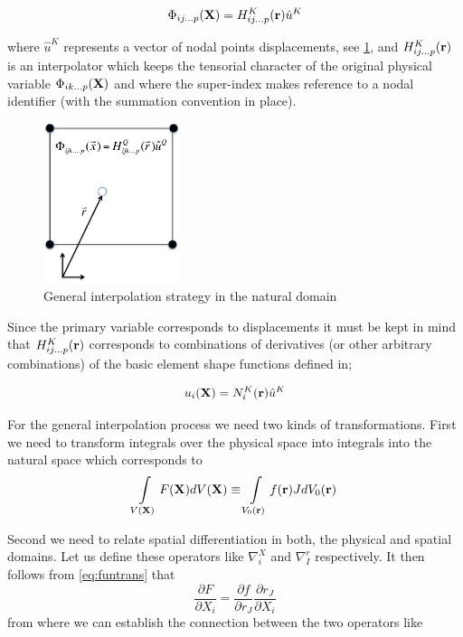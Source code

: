 \begin{equation}
\Phi_{ij...p}(\vb{X})=H_{ij...p}^K(\vb{r})\hat{u}^K
\label{eq:interpol}
\end{equation}

where $\hat{u}^K$ represents a vector of nodal points displacements, see \cref{fig:interpol nat dom}, and $H_{ij...p}^K(\vb{r})$ is an interpolator which keeps the tensorial character of the original physical variable $\Phi_{ik...p}(\vb{X})$ and where the super-index makes reference to a nodal identifier (with the summation convention in place).


\begin{figure}[h]
\centering
\includegraphics[width=4cm]{img/figure2.pdf}
\caption{General interpolation strategy in the natural domain}
\label{fig:interpol nat dom}
\end{figure}
 


Since the primary variable corresponds to displacements it must be kept in mind that $H_{ij...p}^K(\vb{r})$ corresponds to combinations of derivatives (or other arbitrary combinations) of the basic element shape functions defined in;


\begin{equation}
u_i(\vb{X})=N_i^K(\vb{r})\hat{u}^K
\label{eq:el interpol}
\end{equation}



For the general interpolation process we need two kinds of transformations.  First we need to transform integrals over the physical space into integrals into the natural space which corresponds to
\begin{equation}
\int\limits_{V(\vb{X})} F(\vb{X})dV(\vb{X})\equiv \int\limits_{V_0(\vb{r})} f(\vb{r})J dV_0(\vb{r})
\label{gen trans}
\end{equation}



Second we need to relate spatial differentiation in both, the physical and spatial domains.  Let us define these operators like $\nabla_i^X$ and $\nabla_I^r$ respectively. It then follows from \cref{eq:funtrans} that
\begin{equation}
\dfrac{\partial F}{\partial X_i}=\dfrac{\partial f}{\partial r_J}\dfrac{\partial r_J}{\partial X_i}
\label{eq:chain}
\end{equation}
from where we can establish the connection between the two operators like


